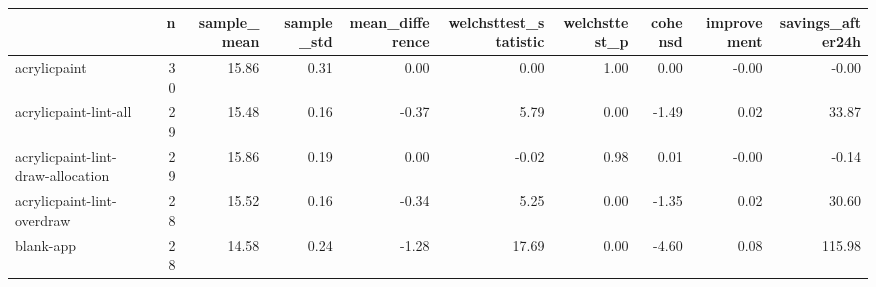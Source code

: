 \begin{tabular}{lrrrrrrrrr}
\toprule
{} &   n &  sample\_mean &  sample\_std &  mean\_difference &  welchsttest\_statistic &  welchsttest\_p &  cohensd &  improvement &  savings\_after24h \\
\midrule
acrylicpaint                      &  30 &        15.86 &        0.31 &             0.00 &                   0.00 &           1.00 &     0.00 &        -0.00 &             -0.00 \\
acrylicpaint-lint-all             &  29 &        15.48 &        0.16 &            -0.37 &                   5.79 &           0.00 &    -1.49 &         0.02 &             33.87 \\
acrylicpaint-lint-draw-allocation &  29 &        15.86 &        0.19 &             0.00 &                  -0.02 &           0.98 &     0.01 &        -0.00 &             -0.14 \\
acrylicpaint-lint-overdraw        &  28 &        15.52 &        0.16 &            -0.34 &                   5.25 &           0.00 &    -1.35 &         0.02 &             30.60 \\
blank-app                         &  28 &        14.58 &        0.24 &            -1.28 &                  17.69 &           0.00 &    -4.60 &         0.08 &            115.98 \\
\bottomrule
\end{tabular}
